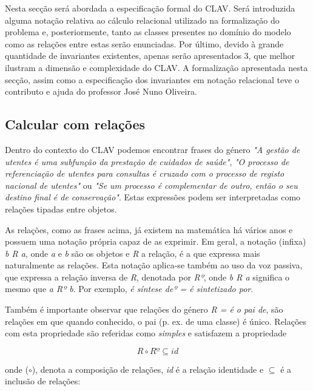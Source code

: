 \documentclass[tikz,runningheads,a4paper]{llncs}
\begin{document}
Nesta secção será abordada a especificação formal do CLAV. Será introduzida alguma notação relativa ao cálculo relacional utilizado na formalização do problema e, posteriormente, tanto as classes presentes no domínio do modelo como as relações entre estas serão enunciadas. Por último, devido à grande quantidade de invariantes existentes, apenas serão apresentados 3, que melhor ilustram a dimensão e complexidade do CLAV. A formalização apresentada nesta secção, assim como a especificação dos invariantes em notação relacional teve o contributo e ajuda do professor José Nuno Oliveira.

\subsection{Calcular com relações\cite{jno}\cite{jno-5}}

Dentro do contexto do CLAV podemos encontrar frases do género \textit{"A gestão de utentes é uma subfunção da prestação de cuidados de saúde"}, \textit{"O processo de referenciação de utentes para consultas é cruzado com o processo de registo nacional de utentes"} ou \textit{"Se um processo é complementar de outro, então o seu destino final é de conservação"}. Estas expressões podem ser interpretadas como relações tipadas entre objetos.

As relações, como as frases acima, já existem na matemática há vários anos e possuem uma notação própria capaz de as exprimir. Em geral, a notação (infixa) \textit{b R a}, onde \textit{a} e \textit{b} são os objetos e \textit{R} a relação, é a que expressa mais naturalmente as relações. Esta notação aplica-se também ao uso da voz passiva, que expressa a relação inversa de \textit{R}, denotada por \textit{Rº}, onde \textit{b R a} significa o mesmo que \textit{a Rº b}. Por exemplo, \textit{é síntese deº = é sintetizado por}.\label{rel_inv}

Também é importante observar que relações do género \textit{R = é o pai de}, são relações em que quando conhecido, o pai (p. ex. de uma classe) é único. Relações com esta propriedade são referidas como \textit{simples} e satisfazem a propriedade

\begin{equation}
\label{eq-simple}
R \circ Rº \subseteq id
\end{equation}

\noindent onde ($\circ$), denota a composição de relações, \textit{id} é a relação identidade e $\subseteq$ é a inclusão de relações:
\end{document}
